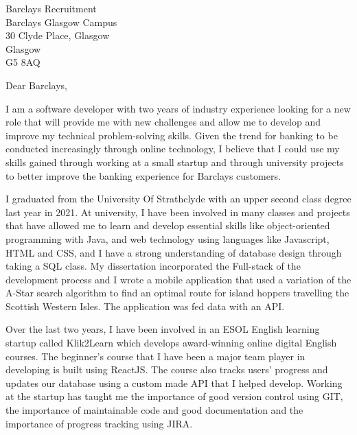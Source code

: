\documentclass[10pt]{letter} %
\begin{document}
	
	
	\begin{letter}{Barclays Recruitment \\ Barclays Glasgow Campus \\ 30 Clyde Place, Glasgow \\ Glasgow \\ G5 8AQ} %
		
		
		\opening{Dear Barclays,}
		
I am a software developer with two years of industry experience looking for a new role that will provide me with new challenges and allow me to develop and improve my technical problem-solving skills. Given the trend for banking to be conducted increasingly through online technology, I believe that I could use my skills gained through working at a small startup and through university projects to better improve the banking experience for Barclays customers. 

I graduated from the University Of Strathclyde with an upper second class degree last year in 2021. At university, I have been involved in many classes and projects that have allowed me to learn and develop essential skills like object-oriented programming with Java, and web technology using languages like Javascript, HTML and CSS, and I have a strong understanding of database design through taking a SQL class. My dissertation incorporated the Full-stack of the development process and I wrote a mobile application that used a variation of the A-Star search algorithm to find an optimal route for island hoppers travelling the Scottish Western Isles. The application was fed data with an API.

Over the last two years, I have been involved in an ESOL English learning startup called Klik2Learn which develops award-winning online digital English courses. The beginner's course that I have been a major team player in developing is built using ReactJS. The course also tracks users' progress and updates our database using a custom made API that I helped develop. Working at the startup has taught me the importance of good version control using GIT, the importance of maintainable code and good documentation and the importance of progress tracking using JIRA.


\end{letter}
\end{document}
